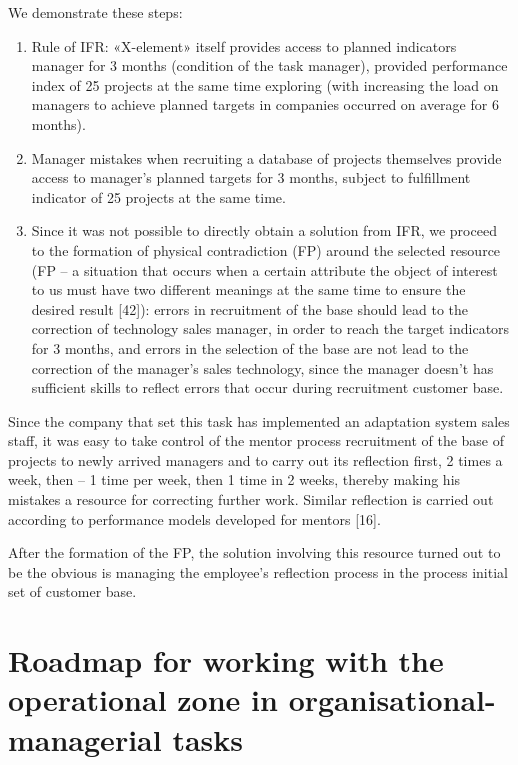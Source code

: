 \documentclass[11pt,a4paper]{book}
\begin{document}
We demonstrate these steps:
\begin{enumerate}
\item Rule of IFR: «X-element» itself provides access to planned indicators
  manager for 3 months (condition of the task manager), provided performance
  index of 25 projects at the same time exploring (with increasing the load on
  managers to achieve planned targets in companies occurred on average for 6
  months).
\item Manager mistakes when recruiting a database of projects themselves
  provide access to manager's planned targets for 3 months, subject to
  fulfillment indicator of 25 projects at the same time.
\item Since it was not possible to directly obtain a solution from IFR, we
  proceed to the formation of physical contradiction (FP) around the selected
  resource (FP -- a situation that occurs when a certain attribute the object
  of interest to us must have two different meanings at the same time to
  ensure the desired result [42]): errors in recruitment of the base should
  lead to the correction of technology sales manager, in order to reach the
  target indicators for 3 months, and errors in the selection of the base are
  not lead to the correction of the manager’s sales technology, since the
  manager doesn’t has sufficient skills to reflect errors that occur during
  recruitment customer base.
\end{enumerate}
Since the company that set this task has implemented an adaptation system
sales staff, it was easy to take control of the mentor process recruitment of
the base of projects to newly arrived managers and to carry out its reflection
first, 2 times a week, then -- 1 time per week, then 1 time in 2 weeks,
thereby making his mistakes a resource for correcting further work. Similar
reflection is carried out according to performance models developed for
mentors [16].

After the formation of the FP, the solution involving this resource turned out
to be the obvious is managing the employee’s reflection process in the process
initial set of customer base.

\section[Roadmap]{Roadmap for working with the operational zone in 
  organisational-managerial tasks}
\end{document}
